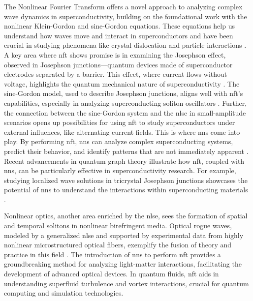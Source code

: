 The Nonlinear Fourier Transform offers a novel approach to analyzing complex wave dynamics in superconductivity, building on the foundational work with the nonlinear Klein-Gordon and sine-Gordon equations. These equations help us understand how waves move and interact in superconductors and have been crucial in studying phenomena like crystal dislocation and particle interactions \cite{dodd1982solitons, drazin1989solitons, frenkel1939theory, perring1962model, gibbon1979example}.
A key area where \acrshort{nft} shows promise is in examining the Josephson effect, observed in Josephson junctions—quantum devices made of superconductor electrodes separated by a barrier. This effect, where current flows without voltage, highlights the quantum mechanical nature of superconductivity \cite{josephson1962possible,josephson1974discovery}. The sine-Gordon model, used to describe Josephson junctions, aligns well with \acrshort{nft}'s capabilities, especially in analyzing superconducting soliton oscillators \cite{parmentier1993solitons}.
Further, the connection between the sine-Gordon system and the \acrshort{nlse} in small-amplitude scenarios opens up possibilities for using \acrshort{nft} to study superconductors under external influences, like alternating current fields. This is where \acrlong{nn}s come into play. By performing \acrshort{nft}, \acrlong{nn}s can analyze complex superconducting systems, predict their behavior, and identify patterns that are not immediately apparent \cite{kaup1978theory, gro1993nonlinear}.
Recent advancements in quantum graph theory illustrate how \acrshort{nft}, coupled with \acrlong{nn}s, can be particularly effective in superconductivity research. For example, studying localized wave solutions in tricrystal Josephson junctions showcases the potential of \acrlong{nn}s to understand the interactions within superconducting materials \cite{gnutzmann2006quantum,kuchment2008quantum,berkolaiko2013introduction,susanto2019soliton}.

Nonlinear optics, another area enriched by the \acrshort{nlse}, sees the formation of spatial and temporal solitons in nonlinear birefringent media. Optical rogue waves, modeled by a generalized \acrshort{nlse} and supported by experimental data from highly nonlinear microstructured optical fibers, exemplify the fusion of theory and practice in this field \cite{solli2007optical,akhmediev2013recent,dudley2008harnessing,bonatto2011deterministic}. The introduction of \acrlong{nn}s to perform \acrshort{nft} provides a groundbreaking method for analyzing light-matter interactions, facilitating the development of advanced optical devices. In quantum fluids, \acrshort{nft} aids in understanding superfluid turbulence and vortex interactions, crucial for quantum computing and simulation technologies.

